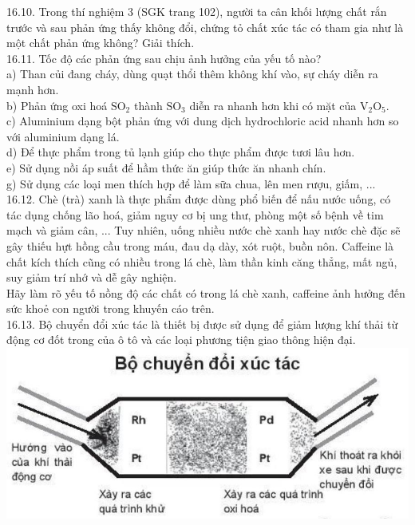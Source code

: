 \documentclass[10pt]{article}
\begin{document}
16.10. Trong thí nghiệm 3 (SGK trang 102), người ta cân khối lượng chất rắn trước và sau phản ứng thấy không đổi, chứng tỏ chất xúc tác có tham gia như là một chất phản ứng không? Giải thích.\\
16.11. Tốc độ các phản ứng sau chịu ảnh hưởng của yếu tố nào?\\
a) Than củi đang cháy, dùng quạt thổi thêm không khí vào, sự cháy diễn ra mạnh hơn.\\
b) Phản ứng oxi hoá $\mathrm{SO}_{2}$ thành $\mathrm{SO}_{3}$ diễn ra nhanh hơn khi có mặt của $\mathrm{V}_{2} \mathrm{O}_{5}$.\\
c) Aluminium dạng bột phản ứng với dung dịch hydrochloric acid nhanh hơn so với aluminium dạng lá.\\
d) Để thực phẩm trong tủ lạnh giúp cho thực phẩm được tươi lâu hơn.\\
e) Sử dụng nồi áp suất để hầm thức ăn giúp thức ăn nhanh chín.\\
g) Sử dụng các loại men thích hợp để làm sữa chua, lên men rượu, giấm, ...\\
16.12. Chè (trà) xanh là thực phẩm được dùng phổ biến để nấu nước uống, có tác dụng chống lão hoá, giảm nguy cơ bị ung thư, phòng một số bệnh về tim mạch và giảm cân, ... Tuy nhiên, uống nhiều nước chè xanh hay nước chè đặc sẽ gây thiếu hựt hồng cầu trong máu, đau dạ dày, xót ruột, buồn nôn. Caffeine là chất kích thích cũng có nhiều trong lá chè, làm thần kinh căng thẳng, mất ngủ, suy giảm trí nhớ và dễ gây nghiện.\\
Hãy làm rõ yếu tố nồng độ các chất có trong lá chè xanh, caffeine ảnh hưởng đến sức khoẻ con người trong khuyến cáo trên.\\
16.13. Bộ chuyển đổi xúc tác là thiết bị được sử dụng để giảm lượng khí thải từ động cơ đốt trong của ô tô và các loại phương tiện giao thông hiện đại.\\
\includegraphics[max width=\textwidth, center]{2025_10_23_883c4b146e2332109fcdg-65(1)}
\end{document}
